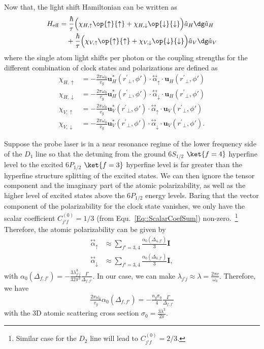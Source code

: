 \documentclass[]{report}
\newcommand{\tensor}[1]{\overset{\leftrightarrow}{#1}} %
\begin{document}
Now that, the light shift Hamiltonian can be written as 
\begin{align}
H_{\rm eff} & = \frac{ \hbar }{ \tau}\Big( \chi_{H,\uparrow}\op{\uparrow}{\uparrow} +  \chi_{H,\downarrow} \op{\downarrow}{\downarrow} \Big) \hat{a}_H\dg \hat{a}_H \nonumber\\
&\quad +  \frac{ \hbar }{ \tau} \Big( \chi_{V,\uparrow}\op{\uparrow}{\uparrow} +  \chi_{V,\downarrow} \op{\downarrow}{\downarrow} \Big) \hat{a}_V\dg \hat{a}_V  \label{HeffLS}
\end{align}
where the single atom light shifts per photon or the coupling strengths for the different combination of clock states and polarizations are defined as
\begin{align}
\chi_{H,\uparrow} &=  -\frac{2\pi\omega_0}{v_g} \mathbf{u}^*_{H}(r^\prime\!\!_\perp,\phi') \cdot\tensor{\alpha}_{\uparrow}\cdot \mathbf{u}_{H}(r^\prime\!\!_\perp,\phi') \\
\chi_{H,\downarrow} &=  -\frac{2\pi\omega_0}{v_g} \mathbf{u}^*_{H}(r^\prime\!\!_\perp,\phi') \cdot\tensor{\alpha}_{\downarrow}\cdot \mathbf{u}_{H}(r^\prime\!\!_\perp,\phi') \\
\chi_{V,\uparrow} &=  -\frac{2\pi\omega_0}{v_g}  \mathbf{u}^*_{V}(r^\prime\!\!_\perp,\phi') \cdot\tensor{\alpha}_{\uparrow}\cdot \mathbf{u}_{V}(r^\prime\!\!_\perp,\phi')  \\
\chi_{V,\downarrow} &=  -\frac{2\pi\omega_0}{v_g}  \mathbf{u}^*_{V}(r^\prime\!\!_\perp,\phi') \cdot\tensor{\alpha}_{\downarrow}\cdot \mathbf{u}_{V}(r^\prime\!\!_\perp,\phi'). 
\end{align}

Suppose the probe laser is in a near resonance regime of the lower frequency side of the $ D_1 $ line so that the detuning from the ground $ 6S_{1/2} $ $ \ket{f=4} $ hyperfine level to the excited $ 6P_{1/2} $ $ \ket{f=3} $ hyperfine level is far greater than the hyperfine structure splitting of the excited states. We can then ignore the tensor component and the imaginary part of the atomic polarizability, as well as the higher level of excited states above the $ 6P_{1/2} $ energy levels. Baring that the vector component of the polarizability for the clock state vanishes, we only have the scalar coefficient $C_{j' f}^{(0)} =1/3  $ (from Equ.~\eqref{Eq::ScalarCoefSum}) non-zero.~\footnote{Similar case for the $ D_2 $ line will lead to $ C_{j' f}^{(0)} =2/3 $.} Therefore, the atomic polarizability can be given by
\begin{align}
\tensor{\alpha}_{\uparrow} &\approx\sum_{f'=3,4}\frac{\alpha_0(\Delta_{4,f'})}{3}\mathbf{I} \\
\tensor{\alpha}_{\downarrow} &\approx\sum_{f'=3,4}\frac{\alpha_0(\Delta_{3,f'})}{3}\mathbf{I},
\end{align}
with $ \alpha_0(\Delta_{f,f'})=-\frac{3\lambda_{j'j}^3}{32\pi^3} \frac{\Gamma}{\Delta_{f,f'}} $. In our case, we can make $ \lambda_{j'j}\approx\lambda= \frac{2\pi c}{\omega_0}$. Therefore, we have
\begin{align}
\frac{2\pi\omega_0}{v_g}\alpha_0(\Delta_{f,f'})=-\frac{n_g\sigma_0}{4} \frac{\Gamma}{\Delta_{f,f'}}
\end{align}
with the 3D atomic scattering cross section $ \sigma_0= \frac{3\lambda^2}{2\pi}  $. 
\end{document}
